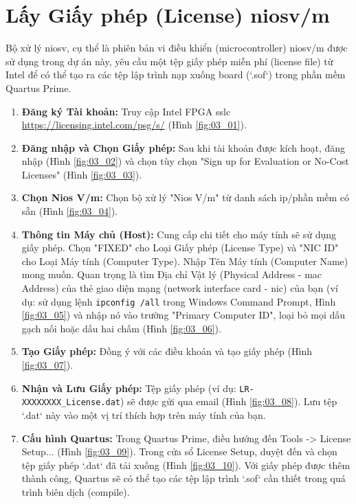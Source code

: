 \section{Lấy Giấy phép (License) \texorpdfstring{\acrshort{niosv}}{Nios V}/m}
\label{sec:get_license} %

Bộ xử lý \acrshort{niosv}, cụ thể là phiên bản vi điều khiển (microcontroller) \acrshort{niosv}/m được sử dụng trong dự án này, yêu cầu một tệp giấy phép miễn phí (license file) từ Intel để có thể tạo ra các tệp lập trình nạp xuống board (`.sof`) trong phần mềm Quartus Prime. 

\begin{enumerate}
    \item \textbf{Đăng ký Tài khoản:} Truy cập Intel FPGA \acrfull{sslc} \url{https://licensing.intel.com/psg/s/} (Hình \ref{fig:03_01}). 
    \item \textbf{Đăng nhập và Chọn Giấy phép:} Sau khi tài khoản được kích hoạt, đăng nhập (Hình \ref{fig:03_02}) và chọn tùy chọn "Sign up for Evaluation or No-Cost Licenses" (Hình \ref{fig:03_03}).
    \item \textbf{Chọn Nios V/m:} Chọn bộ xử lý "Nios V/m" từ danh sách \acrshort{ip}/phần mềm có sẵn (Hình \ref{fig:03_04}).
    \item \textbf{Thông tin Máy chủ (Host):} Cung cấp chi tiết cho máy tính sẽ sử dụng giấy phép. Chọn "FIXED" cho Loại Giấy phép (License Type) và "NIC ID" cho Loại Máy tính (Computer Type). Nhập Tên Máy tính (Computer Name) mong muốn. Quan trọng là tìm Địa chỉ Vật lý (Physical Address - \acrshort{mac} Address) của thẻ giao diện mạng (network interface card - \acrshort{nic}) của bạn (ví dụ: sử dụng lệnh \texttt{ipconfig /all} trong Windows Command Prompt, Hình \ref{fig:03_05}) và nhập nó vào trường "Primary Computer ID", loại bỏ mọi dấu gạch nối hoặc dấu hai chấm (Hình \ref{fig:03_06}).
    \item \textbf{Tạo Giấy phép:} Đồng ý với các điều khoản và tạo giấy phép (Hình \ref{fig:03_07}).
    \item \textbf{Nhận và Lưu Giấy phép:} Tệp giấy phép (ví dụ: \texttt{LR-XXXXXXXX\_License.dat}) sẽ được gửi qua email (Hình \ref{fig:03_08}). Lưu tệp `.dat` này vào một vị trí thích hợp trên máy tính của bạn.
    \item \textbf{Cấu hình Quartus:} Trong Quartus Prime, điều hướng đến Tools -> License Setup... (Hình \ref{fig:03_09}). Trong cửa sổ License Setup, duyệt đến và chọn tệp giấy phép `.dat` đã tải xuống (Hình \ref{fig:03_10}). Với giấy phép được thêm thành công, Quartus sẽ có thể tạo các tệp lập trình `.sof` cần thiết trong quá trình biên dịch (compile).
\end{enumerate}

